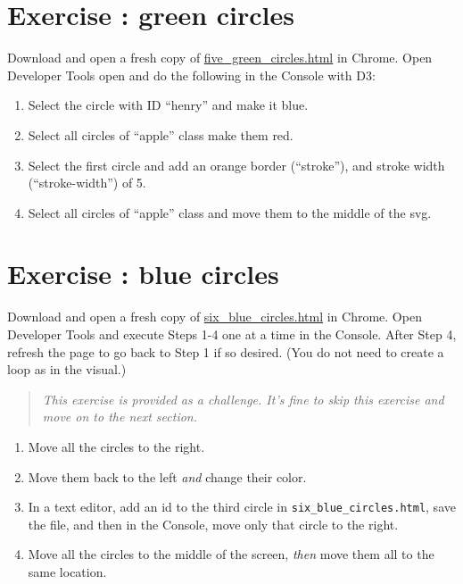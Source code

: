 \documentclass[
  openany]{book}
\begin{document}
\hypertarget{exercise-green-circles}{%
\section{Exercise : green circles}\label{exercise-green-circles}}

Download and open a fresh copy of \href{https://raw.githubusercontent.com/jtr13/d3book/master/code/five_green_circles.html}{five\_green\_circles.html} in Chrome. Open Developer Tools open and do the following in the Console with D3:

\begin{enumerate}
\def\labelenumi{\arabic{enumi}.}
\item
  Select the circle with ID ``henry'' and make it blue.
\item
  Select all circles of ``apple'' class make them red.
\item
  Select the first circle and add an orange border (``stroke''), and stroke width (``stroke-width'') of 5.
\item
  Select all circles of ``apple'' class and move them to the middle of the svg.
\end{enumerate}

\protect\hyperlink{d3-in-the-console-green-circles}{}

\hypertarget{exercise-blue-circles}{%
\section{\texorpdfstring{Exercise : blue circles}{Exercise  : blue circles}}\label{exercise-blue-circles}}

Download and open a fresh copy of \href{https://raw.githubusercontent.com/jtr13/d3book/master/code/six_blue_circles.html}{six\_blue\_circles.html} in Chrome. Open Developer Tools and execute Steps 1-4 one at a time in the Console. After Step 4, refresh the page to go back to Step 1 if so desired. (You do not need to create a loop as in the visual.)

\begin{quote}
\emph{This exercise is provided as a challenge. It's fine to skip this exercise and move on to the next section.}
\end{quote}

\begin{enumerate}
\def\labelenumi{\arabic{enumi}.}
\item
  Move all the circles to the right.
\item
  Move them back to the left \emph{and} change their color.
\item
  In a text editor, add an id to the third circle in \texttt{six\_blue\_circles.html}, save the file, and then in the Console, move only that circle to the right.
\item
  Move all the circles to the middle of the screen, \emph{then} move them all to the same location.
\end{enumerate}
\end{document}
